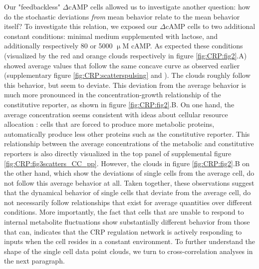Our "feedbackless" $\Delta$cAMP cells allowed us to investigate another question:
how do the stochastic deviations \textit{from} mean behavior relate to the mean behavior itself?
%
To investigate this relation, we exposed our $\Delta$cAMP cells to two additional constant conditions: minimal medium supplemented with lactose, and additionally respectively 80 or 5000 $\upmu$M cAMP.
As expected these conditions (visualized by the red and orange clouds respectively in figure \ref{fig:CRP:fig2}.A) showed average values that follow the same concave curve as observed earlier (supplementary figure \ref{fig:CRP:scatterspulsing} and \cite{Towbin2017}).
%
The clouds roughly follow this behavior, but seem to deviate.
%
This deviation from the average behavior is much more pronounced in the concentration-growth relationship of the constitutive reporter, as shown in figure \ref{fig:CRP:fig2}.B. 
%
On one hand, the average concentration seems consistent with ideas about cellular resource allocation \cite{You2013}: cells that are forced to produce more metabolic proteins, automatically produce less other proteins such as the constitutive reporter. This relationship between the average concentrations of the metabolic and constitutive reporters is also directly visualized in the top panel of supplemental figure \ref{fig:CRP:fig3scatters_CC_pp}.
%
However, the clouds in figure \ref{fig:CRP:fig2}.B on the other hand, which show the deviations of single cells from the average cell, do not follow this average behavior at all.
%
Taken together, these observations suggest that the dynamical behavior of single cells that deviate from the average cell, do not necessarily follow relationships that exist for average quantities over different conditions. More importantly, the fact that cells that are unable to respond to internal metabolite fluctuations show substantially different behavior from those that can, indicates that the CRP regulation network is actively responding to inputs when the cell resides in a constant environment.
%
To further understand the shape of the single cell data point clouds, we turn to cross-correlation analyses in the next paragraph.


